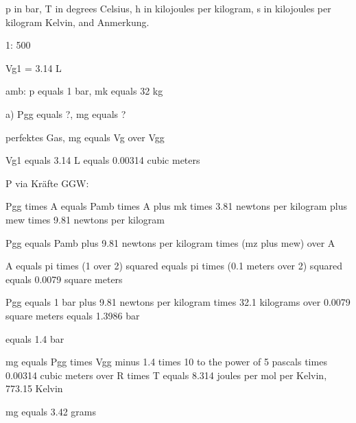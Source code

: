 p in bar, T in degrees Celsius, h in kilojoules per kilogram, s in kilojoules per kilogram Kelvin, and Anmerkung.

1: 500

Vg1 = 3.14 L

amb: p equals 1 bar, mk equals 32 kg

a) Pgg equals ?, mg equals ?

perfektes Gas, mg equals Vg over Vgg

Vg1 equals 3.14 L equals 0.00314 cubic meters

P via Kräfte GGW:

Pgg times A equals Pamb times A plus mk times 3.81 newtons per kilogram plus mew times 9.81 newtons per kilogram

Pgg equals Pamb plus 9.81 newtons per kilogram times (mz plus mew) over A

A equals pi times (1 over 2) squared equals pi times (0.1 meters over 2) squared equals 0.0079 square meters

Pgg equals 1 bar plus 9.81 newtons per kilogram times 32.1 kilograms over 0.0079 square meters equals 1.3986 bar

equals 1.4 bar

mg equals Pgg times Vgg minus 1.4 times 10 to the power of 5 pascals times 0.00314 cubic meters over R times T equals 8.314 joules per mol per Kelvin, 773.15 Kelvin

mg equals 3.42 grams
